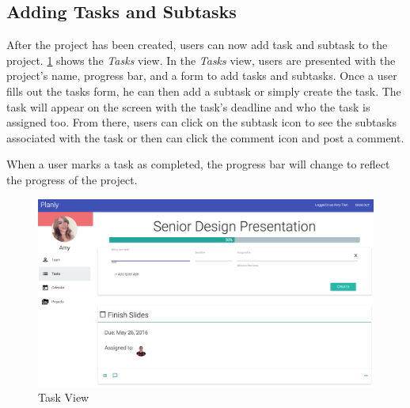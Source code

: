 \subsection{Adding Tasks and Subtasks}
After the project has been created, users can now add task and subtask to the project. \ref{taskview} shows the \emph{Tasks} view. In the \emph{Tasks} view, users are presented with the project's name, progress bar, and a form to add tasks and subtasks. Once a user fills out the tasks form, he can then add a subtask or simply create the task. The task will appear on the screen with the task's deadline and who the task is assigned too. From there, users can click on the subtask icon to see the subtasks associated with the task or then can click the comment icon and post a comment. 
\par When a user marks a task as completed, the progress bar will change to reflect the progress of the project. 

\begin{figure}[ht]
\centering
\includegraphics[width=\textwidth]{figure45.png}
\caption{Task View}
\label{taskview}
\end{figure}
\FloatBarrier



